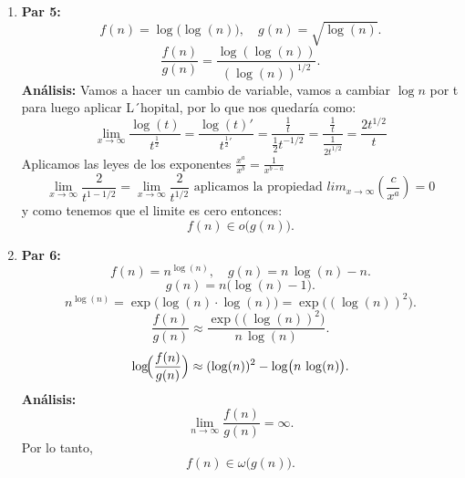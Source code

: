 \documentclass[12pt]{article}
\begin{document}
\begin{enumerate}
  \item \textbf{Par 5:}
  \[
    f(n) = \log\bigl(\log(n)\bigr), \quad g(n) = \sqrt{\log(n)}.
  \]
  \[
    \frac{f(n)}{g(n)} = \frac{\log(\log(n))}{(\log(n))^{1/2}}.
  \]
  \textbf{Análisis:}
  Vamos a hacer un cambio de variable, vamos a cambiar $\log n$ por t para luego aplicar L´hopital, por lo que nos quedaría como:
  \[
  \lim_{x \to \infty} \frac{\log(t)}{t^{\frac{1}{2}}} = \frac{\log(t)'}{t^{\frac{1}{2}'}} = \frac{\frac{1}{t}}{\frac{1}{2}t^{-1/2}} = \frac{\frac{1}{t}}{\frac{1}{2t^{1/2}}} = \frac{2t^{1/2}}{t} 
  \]
  Aplicamos las leyes de los exponentes $\frac{x^a}{x^b}= \frac{1}{x^{b-a}}$
  \[
  \lim_{x \to \infty} \frac{2}{t^{1-1/2}} = \lim_{x \to \infty} \frac{2}{t^{1/2}} \text{ aplicamos la propiedad } lim_{x \to \infty}(\frac{c}{x^a})= 0
  \]
  y como tenemos que el limite es cero entonces:    
  \[
    f(n) \in o\bigl(g(n)\bigr).
  \]

  \item \textbf{Par 6:}
  \[
    f(n) = n^{\log(n)}, \quad g(n) = n \,\log(n) - n.
  \]
  \[
    g(n) = n\bigl(\log(n)-1\bigr).
  \]
  \[
    n^{\log(n)} = \exp\bigl(\log(n)\cdot\log(n)\bigr)= \exp\bigl((\log(n))^2\bigr).
  \]
  \[
    \frac{f(n)}{g(n)} \approx \frac{\exp\bigl((\log(n))^2\bigr)}{n\,\log(n)}.
  \]
  \[
    \log\!\Bigl(\frac{f(n)}{g(n)}\Bigr) \approx (\log(n))^2 - \log\bigl(n\,\log(n)\bigr).
  \]
  \textbf{Análisis:}
  \[
    \lim_{n\to\infty} \frac{f(n)}{g(n)} = \infty.
  \]
  Por lo tanto,
  \[
    f(n) \in \omega\bigl(g(n)\bigr).
  \]


\end{enumerate}
\end{document}
